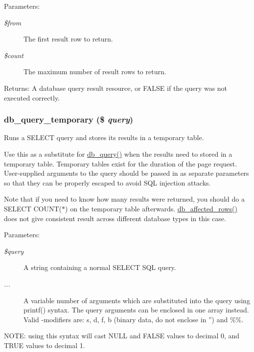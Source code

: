 \begin{Desc}
\item[Parameters:]
\begin{description}
\item[{\em \$from}]The first result row to return. \item[{\em \$count}]The maximum number of result rows to return. \end{description}
\end{Desc}
\begin{Desc}
\item[Returns:]A database query result resource, or FALSE if the query was not executed correctly. \end{Desc}
\hypertarget{group__database_gbce8dcddcded20016a1925824cd09efa}{
\subsubsection[{db\_\-query\_\-temporary}]{\setlength{\rightskip}{0pt plus 5cm}db\_\-query\_\-temporary (\$ {\em query})}}
\label{group__database_gbce8dcddcded20016a1925824cd09efa}


Runs a SELECT query and stores its results in a temporary table.

Use this as a substitute for \hyperlink{database_8mysql-common_8inc_9e096321b86945d128746ac7bedce8f3}{db\_\-query()} when the results need to stored in a temporary table. Temporary tables exist for the duration of the page request. User-supplied arguments to the query should be passed in as separate parameters so that they can be properly escaped to avoid SQL injection attacks.

Note that if you need to know how many results were returned, you should do a SELECT COUNT($\ast$) on the temporary table afterwards. \hyperlink{database_8mysql_8inc_e3bc677fbeebd688068ce3b413ac2944}{db\_\-affected\_\-rows()} does not give consistent result across different database types in this case.

\begin{Desc}
\item[Parameters:]
\begin{description}
\item[{\em \$query}]A string containing a normal SELECT SQL query. \item[{\em ...}]A variable number of arguments which are substituted into the query using printf() syntax. The query arguments can be enclosed in one array instead. Valid -modifiers are: s, d, f, b (binary data, do not enclose in '') and \%\%.\end{description}
\end{Desc}
NOTE: using this syntax will cast NULL and FALSE values to decimal 0, and TRUE values to decimal 1.

